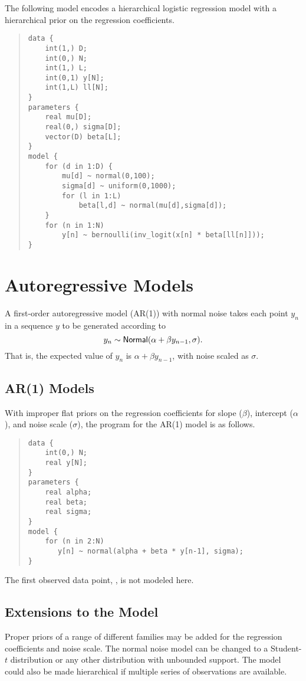 The following model encodes a hierarchical logistic regression model
with a hierarchical prior on the regression coefficients.
%
\begin{quote}
\begin{Verbatim}
data {
    int(1,) D;
    int(0,) N;
    int(1,) L;
    int(0,1) y[N];
    int(1,L) ll[N];
}
parameters {
    real mu[D];
    real(0,) sigma[D];
    vector(D) beta[L];
}
model {
    for (d in 1:D) {
        mu[d] ~ normal(0,100);
        sigma[d] ~ uniform(0,1000);
        for (l in 1:L)
            beta[l,d] ~ normal(mu[d],sigma[d]);
    }
    for (n in 1:N)
        y[n] ~ bernoulli(inv_logit(x[n] * beta[ll[n]]));
}
\end{Verbatim}
\end{quote}   


\section{Autoregressive Models}

A first-order autoregressive model (AR(1)) with normal noise takes
each point $y_n$ in a sequence $y$ to be generated according to
%
\[
y_n \sim \mbox{\sf Normal}(\alpha + \beta y_{n-1}, \sigma).
\]
%
That is, the expected value of $y_n$ is $\alpha + \beta y_{n-1}$, with
noise scaled as $\sigma$.

\subsection{AR(1) Models}

With improper flat priors on the regression coefficients for slope
($\beta$), intercept ($\alpha$), and noise scale ($\sigma$),
the \Stan program for the AR(1) model is as follows.
%
\begin{quote}
\begin{Verbatim}
data {
    int(0,) N;
    real y[N];
}
parameters {
    real alpha;
    real beta;
    real sigma;
}
model {
    for (n in 2:N)
       y[n] ~ normal(alpha + beta * y[n-1], sigma);
}
\end{Verbatim}
\end{quote}
%
The first observed data point, , is not modeled here.  

\subsection{Extensions to the Model} 

Proper priors of a range of different families may be added for the
regression coefficients and noise scale.  The normal noise model can
be changed to a Student-$t$ distribution or any other distribution
with unbounded support.  The model could also be made hierarchical if
multiple series of observations are available.  

